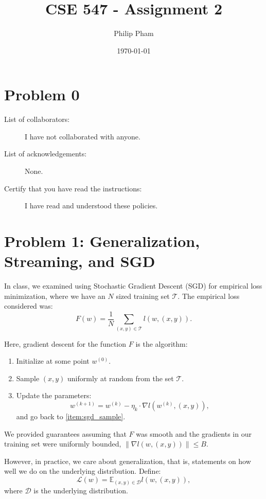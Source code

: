 \documentclass[letterpaper,11pt]{article}
\author{Philip Pham}
\date{\today}
\title{CSE 547 - Assignment 2}
\begin{document}
\maketitle

\section*{Problem 0}

\begin{description}
\item[List of collaborators:] I have not collaborated with anyone.
\item[List of acknowledgements:] None.
\item[Certify that you have read the instructions:] I have read and understood
  these policies.
\end{description}

\section*{Problem 1: Generalization, Streaming, and SGD}

In class, we examined using Stochastic Gradient Descent (SGD) for empirical loss
minimization, where we have an $N$ sized training set $\mathcal{T}$. The
empirical loss considered was:
\begin{equation}
  F(w) = \frac{1}{N} \sum_{(x,y) \in \mathcal{T}} l\left(w,(x,y)\right).
\end{equation}

Here, gradient descent for the function $F$ is the algorithm:
\begin{enumerate}
\item Initialize at some point $w^{(0)}$.
\item Sample $(x,y)$ uniformly at random from the set $\mathcal{T}$.
  \label{item:sgd_sample}
\item Update the parameters:
  \begin{equation}
    w^{(k+1)} = w^{(k)} - \eta_k \cdot \nabla l\left(w^{(k)},(x,y)\right),
  \end{equation}
  and go back to \ref{item:sgd_sample}.
\end{enumerate}

We provided guarantees assuming that $F$ was smooth and the gradients in our
training set were uniformly bounded,
$\lVert \nabla l\left(w, (x,y)\right) \rVert \leq B$.

However, in practice, we care about generalization, that is, statements on how
well we do on the underlying distribution. Define:
\begin{equation}
  \mathcal{L}(w) = \mathbb{E}_{(x,y) \in \mathcal{D}}l\left(w, (x,y)\right),
\end{equation}
where $\mathcal{D}$ is the underlying distribution.
\end{document}
